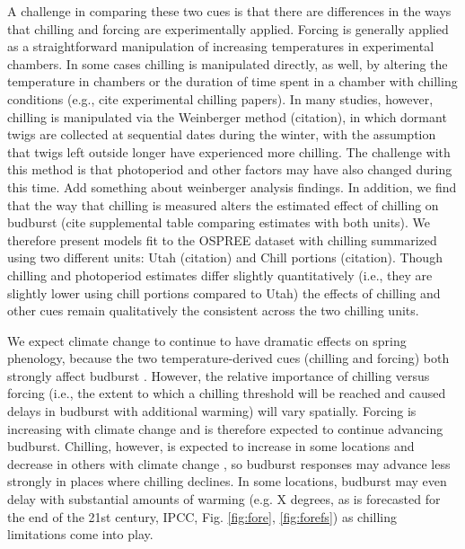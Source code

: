 \documentclass[11pt,letter]{article}
\begin{document}
A challenge in comparing these two cues is that there are differences in the ways that chilling and forcing are experimentally applied. Forcing is generally applied as a straightforward manipulation of increasing temperatures in experimental chambers. In some cases chilling is manipulated directly, as well, by altering the temperature in chambers or the duration of time spent in a chamber with chilling conditions (e.g., cite experimental chilling papers). In many studies, however, chilling is manipulated via the Weinberger method (citation), in which dormant twigs are collected at sequential dates during the winter, with the assumption that twigs left outside longer have experienced more chilling. The challenge with this method is that photoperiod and other factors may have also changed during this time. Add something about weinberger analysis findings. %
In addition, we find that the way that chilling is measured alters the estimated effect of chilling on budburst (cite supplemental table comparing estimates with both units). We therefore present models fit to the OSPREE dataset with chilling summarized using two different units: Utah (citation) and Chill portions (citation). Though chilling and photoperiod estimates differ slightly quantitatively (i.e., they are slightly lower using chill portions compared to Utah) the effects of chilling and other cues remain qualitatively the consistent across the two chilling units.  

\par We expect climate change to continue to have dramatic effects on spring phenology, because the two temperature-derived cues (chilling and forcing)  both strongly affect budburst  \citep{Laube2014a}. However, the relative importance of chilling versus forcing (i.e., the extent to which a chilling threshold will be reached and caused delays in budburst with additional warming) will vary spatially. Forcing is increasing with climate change and is therefore expected to continue advancing budburst. Chilling, however, is expected to increase in some locations and decrease in others with climate change  \citep{fraga2019}, so budburst responses may advance less strongly in places where chilling declines. In some locations, budburst may even delay with substantial amounts of warming (e.g. X degrees, as is forecasted for the end of the 21st century, IPCC, Fig. \ref {fig:fore}, \ref {fig:forefs}) as chilling limitations come into play. 
\end{document}

